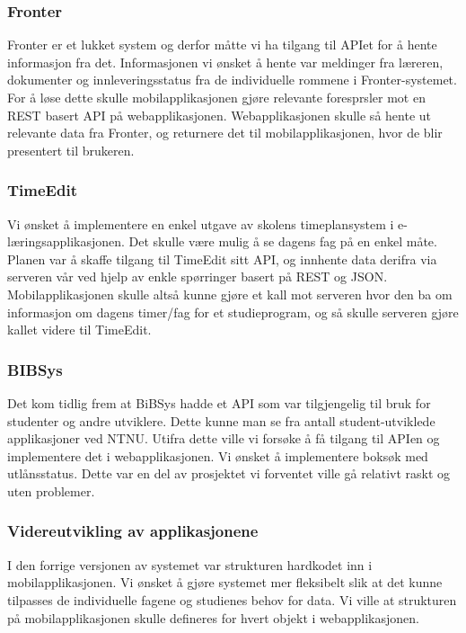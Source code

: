 \documentclass[../main.tex]{subfiles}
\begin{document}
\subsubsection{Fronter}
Fronter er et lukket system og derfor måtte vi ha tilgang til APIet for å hente informasjon fra det. Informasjonen vi ønsket å hente var meldinger fra læreren, dokumenter og innleveringsstatus fra de individuelle rommene i Fronter-systemet. For å løse dette skulle mobilapplikasjonen gjøre relevante foresprsler mot en REST basert API på webapplikasjonen. Webapplikasjonen skulle så hente ut relevante data fra Fronter, og returnere det til mobilapplikasjonen, hvor de blir presentert til brukeren.
\subsubsection{TimeEdit}
Vi ønsket å implementere en enkel utgave av skolens timeplansystem i e-læringsapplikasjonen. Det skulle være mulig å se dagens fag på en enkel måte. Planen var å skaffe tilgang til TimeEdit sitt API, og innhente data derifra via serveren vår ved hjelp av enkle spørringer basert på REST og JSON. Mobilapplikasjonen skulle altså kunne gjøre et kall mot serveren hvor den ba om informasjon om dagens timer/fag for et studieprogram, og så skulle serveren gjøre kallet videre til TimeEdit.
\subsubsection{BIBSys}
Det kom tidlig frem at BiBSys hadde et API som var tilgjengelig til bruk for studenter og andre utviklere. Dette kunne man se fra antall student-utviklede applikasjoner ved NTNU. Utifra dette ville vi forsøke å få tilgang til APIen og implementere det i webapplikasjonen. Vi ønsket å implementere boksøk med utlånsstatus. Dette var en del av prosjektet vi forventet ville gå relativt raskt og uten problemer.

\subsubsection{Videreutvikling av applikasjonene}
I den forrige versjonen av systemet var strukturen hardkodet inn i mobilapplikasjonen. Vi ønsket å gjøre systemet mer fleksibelt slik at det kunne tilpasses de individuelle fagene og studienes behov for data. Vi ville at strukturen på mobilapplikasjonen skulle defineres for hvert objekt i webapplikasjonen.
\end{document}
